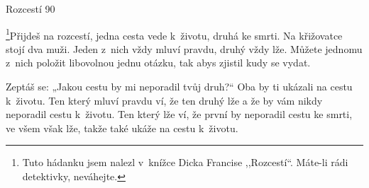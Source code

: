 Rozcestí
90 %

\footnote{Tuto hádanku jsem nalezl v~knížce Dicka Francise ,,Rozcestí``. Máte-li rádi detektivky, neváhejte.}Přijdeš na rozcestí, jedna cesta vede k~životu, druhá ke smrti. Na křižovatce stojí dva muži. Jeden z~nich vždy mluví pravdu, druhý vždy lže. Můžete jednomu z~nich položit libovolnou jednu otázku, tak abys zjistil kudy se vydat.


Zeptáš se: „Jakou cestu by mi neporadil tvůj druh?“ Oba by ti ukázali na cestu k~životu. Ten který mluví pravdu ví, že ten druhý lže a že by vám nikdy neporadil cestu k~životu. Ten který lže ví, že první by neporadil cestu ke smrti, ve všem však lže, takže také ukáže na cestu k~životu.
